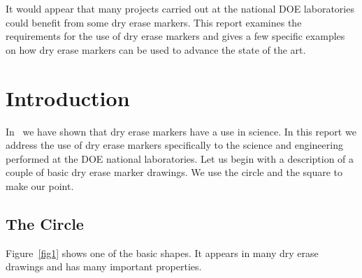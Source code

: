 \documentclass[pdf,ps2pdf,12pt]{smemo}
\begin{document}
    \begin{memo}

    \thispagestyle{plain}  %


    \date{}




    \subject{On the Use of Dry Erase Markers at National Laboratories (SAMPLE -
      CONTAINS NO OUO)}

    It would appear that many projects carried out at the national DOE
    laboratories could benefit from some dry erase markers. This report examines the
    requirements for the use of dry erase markers and gives a few specific examples on
    how dry erase markers can be used to advance the state of the art.

    \section{Introduction}\label{Intro}
    In~\cite{Potter} we have shown that dry erase markers have
    a use in science. In this report we address the use of dry
    erase markers specifically to the science and engineering
    performed at the DOE national laboratories. Let us begin
    with a description of a couple of basic dry erase marker
    drawings. We use the circle and the square to make our point.

    \subsection{The Circle}
	    Figure~\ref{fig1} shows one of the basic shapes. It
	    appears in many dry erase drawings and has many important
	    properties.


\end{memo}
\end{document}
